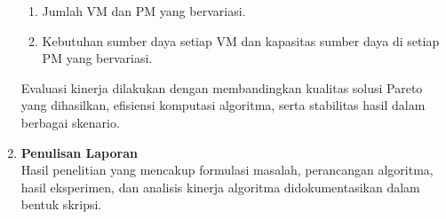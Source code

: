 \begin{enumerate}
\begin{enumerate}
     \item Jumlah VM dan PM yang bervariasi.
    
     \item Kebutuhan sumber daya setiap VM dan kapasitas sumber daya di setiap PM yang bervariasi.
    \end{enumerate}      
    Evaluasi kinerja dilakukan dengan membandingkan kualitas solusi Pareto yang dihasilkan, efisiensi komputasi algoritma, serta stabilitas hasil dalam berbagai skenario.
        
\item \textbf{Penulisan Laporan} \\
    Hasil penelitian yang mencakup formulasi masalah, perancangan algoritma, hasil eksperimen, dan analisis kinerja algoritma didokumentasikan dalam bentuk skripsi.
\end{enumerate}
